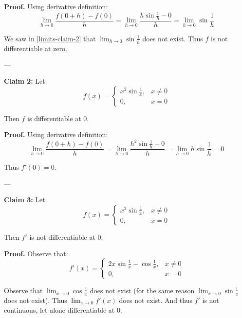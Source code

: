 \vs

\textbf{Proof.} Using derivative definition:
\[\lim_{h\to0}\frac{f(0+h)-f(0)}{h}=\lim_{h\to0}\frac{h\sin
    \frac{1}{h}-0}{h}=\lim_{h\to0}\sin \frac{1}{h}\]

We saw in \ref{limits-claim-2} that $\lim_{h\to0}\sin \frac{1}{h}$ does
not exist. Thus $f$ is not differentiable at zero.

\vs---\vs

\textbf{Claim 2:} Let
\[f(x)=\begin{cases}
  x^2\sin \frac{1}{x},&x\neq0\\
  0,&x=0
\end{cases}\]

Then $f$ is differentiable at $0$.

\vs

\textbf{Proof.} Using derivative definition:
\[\lim_{h\to0}\frac{f(0+h)-f(0)}{h}=\lim_{h\to0}\frac{h^2\sin
    \frac{1}{h}-0}{h}=\lim_{h\to0}h\sin \frac{1}{h}=0\]

Thus $f'(0)=0$.

\vs---\vs

\textbf{Claim 3:} Let
\[f(x)=\begin{cases}
  x^2\sin \frac{1}{x},&x\neq0\\
  0,&x=0
\end{cases}\]

Then $f'$ is not differentiable at $0$.

\vs

\textbf{Proof.} Observe that:
\[f'(x)=\begin{cases}
  2x\sin \frac{1}{x}-\cos \frac{1}{x},&x\neq0\\
  0,&x=0
\end{cases}\]

Observe that $\lim_{x\to0}\cos \frac{1}{x}$ does not exist (for the same
reason $\lim_{x\to0}\sin \frac{1}{x}$ does not exist). Thus
$\lim_{x\to0}f'(x)$ does not exist. And thus $f'$ is not continuous, let
alone differentiable at $0$.


